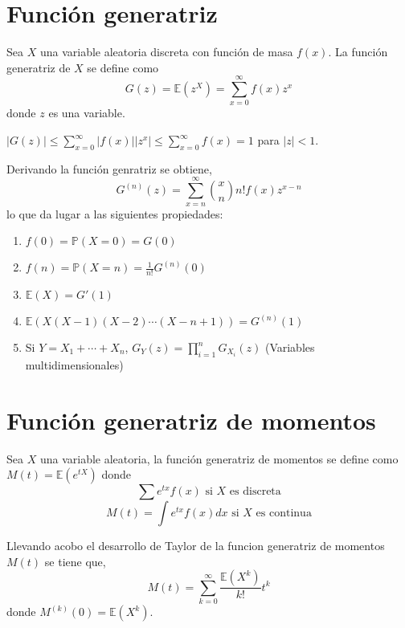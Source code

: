 \section{Función generatriz}

\begin{defn}
Sea $X$ una variable aleatoria discreta con función de masa $f(x)$. La función generatriz de $X$ se define como \[ G(z) = \mathbb{E}(z^X) = \sum_{x=0}^\infty f(x)z^x \] donde $z$ es una variable.
\end{defn}

\begin{obs}
$|G(z)| \leq \sum_{x=0}^\infty |f(x)||z^x| \leq \sum_{x=0}^\infty f(x) = 1 $ para $|z|<1$. 
\end{obs}

\begin{prop}
Derivando la función genratriz se obtiene, \[ G^{(n)}(z) = \sum_{x=n}^\infty \binom{x}{n} n! f(x)z^{x-n} \]
lo que da lugar a las siguientes propiedades:

\begin{enumerate}[label=(\roman*)]
    \item $f(0) = \mathbb{P}(X = 0) = G(0)$
    \item $f(n) = \mathbb{P}(X = n) = \frac{1}{n!} G^{(n)}(0)$
    \item $\mathbb{E}(X) = G'(1)$
    \item $\mathbb{E}(X(X-1)(X-2)\cdots(X-n+1)) = G^{(n)}(1)$
    \item Si $Y = X_1 + \cdots + X_n$, $G_Y(z) = \prod_{i=1}^n G_{X_i}(z)$ (Variables multidimensionales)
\end{enumerate}

\end{prop}

\section{Función generatriz de momentos}

\begin{defn}
Sea $X$ una variable aleatoria, la función generatriz de momentos se define como $M(t) = \mathbb{E}(e^{tX})$ donde \[ \sum e^{tx}f(x) \text{ si $X$ es discreta} \] \[ M(t) = \int e^{tx}f(x)dx \text{ si $X$ es continua} \]
\end{defn}

\begin{prop}
Llevando acobo el desarrollo de Taylor de la funcion generatriz de momentos $M(t)$ se tiene que, \[ M(t) = \sum_{k=0}^\infty \frac{\mathbb{E}(X^k)}{k!}t^k \] donde $M^{(k)}(0) = \mathbb{E}(X^k)$.
\end{prop}

